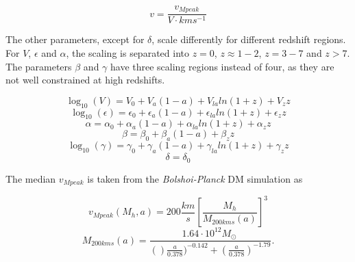 \begin{equation}
    v = \frac{v_{Mpeak}}{V \cdot km s^{-1}}
\end{equation}

The other parameters, except for $\delta$, scale differently for different redshift regions. For $V$, $\epsilon$ and $\alpha$, the scaling is separated into $z=0$, $z\approx 1-2$, $z=3-7$ and $z>7$. The parameters $\beta$ and $\gamma$ have three scaling regions instead of four, as they are not well constrained at high redshifts. 

\begin{equation}
    \log_{10}(V) = V_0 + V_a(1-a)+V_{la}ln(1+z)+V_z z
\end{equation}
\begin{equation}
    \log_{10}(\epsilon) = \epsilon_0 + \epsilon_a(1-a)+\epsilon_{la}ln(1+z)+\epsilon_z z
\end{equation}
\begin{equation}
    \alpha = \alpha_0 + \alpha_a(1-a)+\alpha_{la}ln(1+z)+\alpha_z z
\end{equation}
\begin{equation}
    \beta = \beta_0 + \beta_a(1-a)+\beta_z z
\end{equation}
\begin{equation}
    \log_{10}(\gamma) = \gamma_0 + \gamma_a(1-a)+\gamma_{la}ln(1+z)+\gamma_z z
\end{equation}
\begin{equation}
    \delta = \delta_0
\end{equation}

The median $v_{Mpeak}$ is taken from the \textit{Bolshoi-Planck} DM simulation as

\begin{equation}
    v_{Mpeak}(M_h, a) = 200 \frac{km}{s}\left[ \frac{M_h}{M_{200kms}(a)}\right]^3
    \label{v_mpeak-M_h-relation}
\end{equation}
\begin{equation}
    M_{200kms}(a) = \frac{1.64 \cdot 10^{12} M_\odot\ }{()\frac{a}{0.378})^{-0.142}+(\frac{a}{0.378})^{-1.79}} .
\end{equation}


